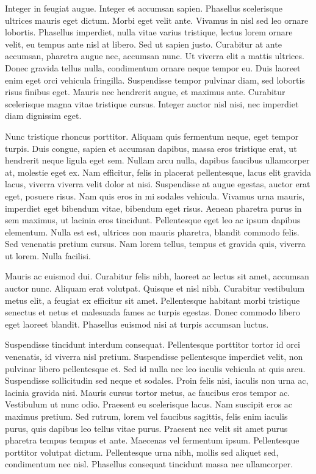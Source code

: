 Integer in feugiat augue. Integer et accumsan sapien. Phasellus scelerisque ultrices mauris eget dictum. Morbi eget velit ante. Vivamus in nisl sed leo ornare lobortis. Phasellus imperdiet, nulla vitae varius tristique, lectus lorem ornare velit, eu tempus ante nisl at libero. Sed ut sapien justo. Curabitur at ante accumsan, pharetra augue nec, accumsan nunc. Ut viverra elit a mattis ultrices. Donec gravida tellus nulla, condimentum ornare neque tempor eu. Duis laoreet enim eget orci vehicula fringilla. Suspendisse tempor pulvinar diam, sed lobortis risus finibus eget. Mauris nec hendrerit augue, et maximus ante. Curabitur scelerisque magna vitae tristique cursus. Integer auctor nisl nisi, nec imperdiet diam dignissim eget.

Nunc tristique rhoncus porttitor. Aliquam quis fermentum neque, eget tempor turpis. Duis congue, sapien et accumsan dapibus, massa eros tristique erat, ut hendrerit neque ligula eget sem. Nullam arcu nulla, dapibus faucibus ullamcorper at, molestie eget ex. Nam efficitur, felis in placerat pellentesque, lacus elit gravida lacus, viverra viverra velit dolor at nisi. Suspendisse at augue egestas, auctor erat eget, posuere risus. Nam quis eros in mi sodales vehicula. Vivamus urna mauris, imperdiet eget bibendum vitae, bibendum eget risus. Aenean pharetra purus in sem maximus, ut lacinia eros tincidunt. Pellentesque eget leo ac ipsum dapibus elementum. Nulla est est, ultrices non mauris pharetra, blandit commodo felis. Sed venenatis pretium cursus. Nam lorem tellus, tempus et gravida quis, viverra ut lorem. Nulla facilisi.

Mauris ac euismod dui. Curabitur felis nibh, laoreet ac lectus sit amet, accumsan auctor nunc. Aliquam erat volutpat. Quisque et nisl nibh. Curabitur vestibulum metus elit, a feugiat ex efficitur sit amet. Pellentesque habitant morbi tristique senectus et netus et malesuada fames ac turpis egestas. Donec commodo libero eget laoreet blandit. Phasellus euismod nisi at turpis accumsan luctus.

Suspendisse tincidunt interdum consequat. Pellentesque porttitor tortor id orci venenatis, id viverra nisl pretium. Suspendisse pellentesque imperdiet velit, non pulvinar libero pellentesque et. Sed id nulla nec leo iaculis vehicula at quis arcu. Suspendisse sollicitudin sed neque et sodales. Proin felis nisi, iaculis non urna ac, lacinia gravida nisi. Mauris cursus tortor metus, ac faucibus eros tempor ac. Vestibulum ut nunc odio. Praesent eu scelerisque lacus. Nam suscipit eros ac maximus pretium. Sed rutrum, lorem vel faucibus sagittis, felis enim iaculis purus, quis dapibus leo tellus vitae purus. Praesent nec velit sit amet purus pharetra tempus tempus et ante. Maecenas vel fermentum ipsum. Pellentesque porttitor volutpat dictum. Pellentesque urna nibh, mollis sed aliquet sed, condimentum nec nisl. Phasellus consequat tincidunt massa nec ullamcorper.

